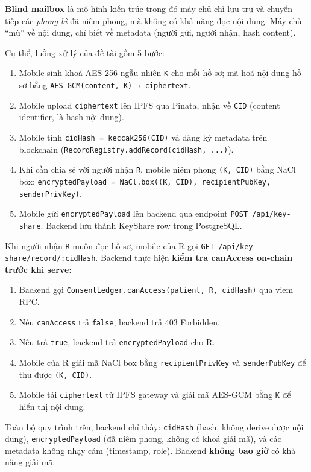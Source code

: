 \documentclass[../DoAn]{subfiles}
\begin{document}
\textbf{Blind mailbox} là mô hình kiến trúc trong đó máy chủ chỉ lưu trữ và chuyển tiếp các \textit{phong bì} đã niêm phong, mà không có khả năng đọc nội dung. Máy chủ ``mù'' về nội dung, chỉ biết về metadata (người gửi, người nhận, hash content).

Cụ thể, luồng xử lý của đề tài gồm 5 bước:

\begin{enumerate}
    \item Mobile sinh khoá AES-256 ngẫu nhiên \texttt{K} cho mỗi hồ sơ; mã hoá nội dung hồ sơ bằng \texttt{AES-GCM(content, K) → ciphertext}.
    \item Mobile upload \texttt{ciphertext} lên IPFS qua Pinata, nhận về \texttt{CID} (content identifier, là hash nội dung).
    \item Mobile tính \texttt{cidHash = keccak256(CID)} và đăng ký metadata trên blockchain (\texttt{RecordRegistry.addRecord(cidHash, ...)}).
    \item Khi cần chia sẻ với người nhận \texttt{R}, mobile niêm phong \texttt{(K, CID)} bằng NaCl box: \texttt{encryptedPayload = NaCl.box((K, CID), recipientPubKey, senderPrivKey)}.
    \item Mobile gửi \texttt{encryptedPayload} lên backend qua endpoint \texttt{POST /api/key-share}. Backend lưu thành KeyShare row trong PostgreSQL.
\end{enumerate}

Khi người nhận \texttt{R} muốn đọc hồ sơ, mobile của R gọi \texttt{GET /api/key-share/record/:cidHash}. Backend thực hiện \textbf{kiểm tra canAccess on-chain trước khi serve}:

\begin{enumerate}
    \item Backend gọi \texttt{ConsentLedger.canAccess(patient, R, cidHash)} qua viem RPC.
    \item Nếu \texttt{canAccess} trả \texttt{false}, backend trả 403 Forbidden.
    \item Nếu trả \texttt{true}, backend trả \texttt{encryptedPayload} cho R.
    \item Mobile của R giải mã NaCl box bằng \texttt{recipientPrivKey} và \texttt{senderPubKey} để thu được \texttt{(K, CID)}.
    \item Mobile tải \texttt{ciphertext} từ IPFS gateway và giải mã AES-GCM bằng \texttt{K} để hiển thị nội dung.
\end{enumerate}

Toàn bộ quy trình trên, backend chỉ thấy: \texttt{cidHash} (hash, không derive được nội dung), \texttt{encryptedPayload} (đã niêm phong, không có khoá giải mã), và các metadata không nhạy cảm (timestamp, role). Backend \textbf{không bao giờ} có khả năng giải mã.
\end{document}

